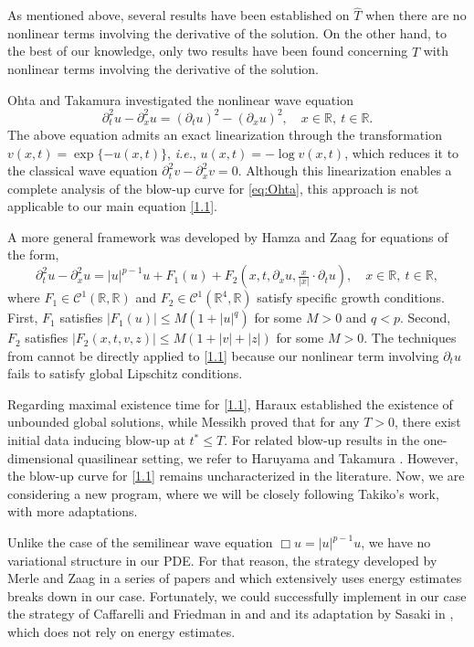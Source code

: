 \documentclass[
  sn-mathphys-num,
  colorlinks,
  linkcolor=darkmagenta,
  citecolor=rufous,
  urlcolor=zaffre,
  hypertexnames=false
]{sn-jnl}
\numberwithin{equation}{section}
\begin{document}
As mentioned above, several results have been established on $\hat{T}$ when there are no nonlinear terms involving the derivative of the solution. On the other hand, to the best of our knowledge, only two results have been found concerning $\hat{T}$ with nonlinear terms involving the derivative of the solution.

Ohta and Takamura \cite{Ohta1998} investigated the nonlinear wave equation
\begin{equation}
\partial_t^2 u - \partial_x^2 u = (\partial_t u)^2 - (\partial_x u)^2, \quad x \in \mathbb{R},\ t \in \mathbb{R}.
\label{eq:Ohta}
\end{equation}
The above equation admits an exact linearization through the transformation $v(x,t) = \exp\{-u(x,t)\}$, \textit{i.e.}, $u(x,t) = -\log v(x,t)$, which reduces it to the classical wave equation $\partial_t^2 v - \partial_x^2 v = 0$. Although this linearization enables a complete analysis of the blow-up curve for \eqref{eq:Ohta}, this approach is not applicable to our main equation \eqref{1.1}.

A more general framework was developed by Hamza and Zaag \cite{HamzaZaag2013} for equations of the form,
$$
\partial_t^2 u - \partial_x^2 u = |u|^{p-1}u + F_1(u) + F_2\left(x, t, \partial_x u, \tfrac{x}{|x|} \cdot \partial_t u\right), \quad x \in \mathbb{R},\ t \in \mathbb{R},
$$
where $F_1 \in \mathcal{C}^1(\mathbb{R},\mathbb{R})$ and $F_2 \in \mathcal{C}^1(\mathbb{R}^4,\mathbb{R})$ satisfy specific growth conditions. First, $F_1$ satisfies $|F_1(u)| \leq M(1 + |u|^q)$ for some $M > 0$ and $q < p$. Second, $F_2$ satisfies $|F_2(x,t,v,z)| \leq M(1 + |v| + |z|)$ for some $M > 0$. The techniques from \cite{HamzaZaag2013} cannot be directly applied to \eqref{1.1} because our nonlinear term involving $\partial_t u$ fails to satisfy global Lipschitz conditions.

Regarding maximal existence time for \eqref{1.1}, Haraux \cite{Haraux1992} established the existence of unbounded global solutions, while Messikh \cite{Messikh2011} proved that for any $T > 0$, there exist initial data inducing blow-up at $t^* \leq T$. For related blow-up results in the one-dimensional quasilinear setting, we refer to Haruyama and Takamura \cite{HaruyamaTakamuraQuasilinear2025}.
However, the blow-up curve for \eqref{1.1} remains uncharacterized in the literature.  Now, we are considering a new program, where we will be closely following Takiko’s work, with more adaptations.

Unlike the case of the semilinear wave equation $\Box u = |u|^{p-1}u$, we have no variational structure in our PDE. For that reason, the strategy developed by Merle and Zaag in a series of papers \cite{MZajm03, MZimrn05, MZjfa07, MZcmp08} and which extensively uses energy estimates breaks down in our case. Fortunately, we could successfully implement in our case the strategy of Caffarelli and Friedman in \cite{Caffarelli1985} and \cite{Caffarelli1986} and its adaptation by Sasaki in \cite{Sasaki2018, Sasaki2019}, which does not rely on energy estimates.
\end{document}
